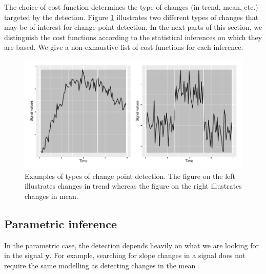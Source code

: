 The choice of cost function determines the type of changes (in trend, mean, etc.) targeted by the detection. Figure \ref{fig:ex_cp} illustrates two different types of changes that may be of interest for change point detection. In the next parts of this section, we distinguish the cost functions according to the statistical inferences on which they are based. We give a non-exhaustive list of cost functions for each inference.

\begin{figure}[ht]
    \centering
    \includegraphics{figs/Chap2/Ex_CP_cost.pdf}
    \caption{Examples of types of change point detection. The figure on the left illustrates changes in trend whereas the figure on the right illustrates changes in mean.}
    \label{fig:ex_cp}
\end{figure}

\subsection{Parametric inference}

In the parametric case, the detection depends heavily on what we are looking for in the signal $\bm y$. For example, searching for slope changes in a signal \citep{Bai1994,Fearnhead2018} does not require the same modelling as detecting changes in the mean \citep{Frick2014,chen2012parametric}. 

